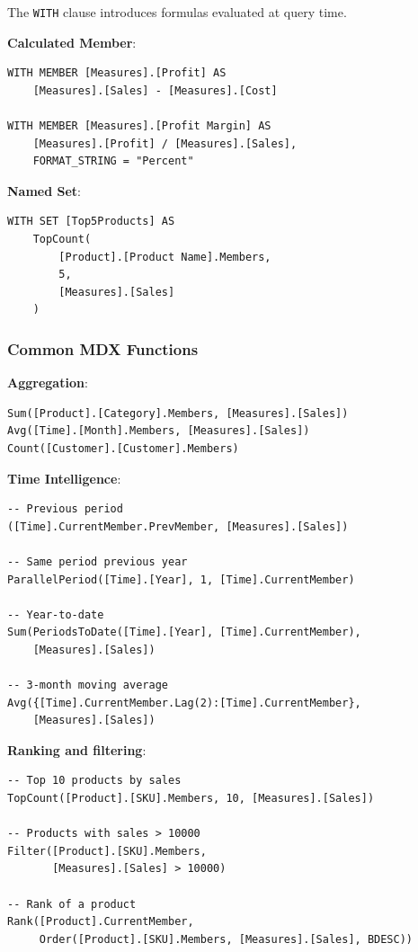 The \texttt{WITH} clause introduces formulas evaluated at query time.

\textbf{Calculated Member}:
\begin{lstlisting}
WITH MEMBER [Measures].[Profit] AS
    [Measures].[Sales] - [Measures].[Cost]

WITH MEMBER [Measures].[Profit Margin] AS
    [Measures].[Profit] / [Measures].[Sales],
    FORMAT_STRING = "Percent"
\end{lstlisting}

\textbf{Named Set}:
\begin{lstlisting}
WITH SET [Top5Products] AS
    TopCount(
        [Product].[Product Name].Members,
        5,
        [Measures].[Sales]
    )
\end{lstlisting}

\subsubsection{Common MDX Functions}
\label{subsec:mdx-common-functions}

\textbf{Aggregation}:
\begin{lstlisting}
Sum([Product].[Category].Members, [Measures].[Sales])
Avg([Time].[Month].Members, [Measures].[Sales])
Count([Customer].[Customer].Members)
\end{lstlisting}

\textbf{Time Intelligence}:
\begin{lstlisting}
-- Previous period
([Time].CurrentMember.PrevMember, [Measures].[Sales])

-- Same period previous year
ParallelPeriod([Time].[Year], 1, [Time].CurrentMember)

-- Year-to-date
Sum(PeriodsToDate([Time].[Year], [Time].CurrentMember),
    [Measures].[Sales])

-- 3-month moving average
Avg({[Time].CurrentMember.Lag(2):[Time].CurrentMember},
    [Measures].[Sales])
\end{lstlisting}

\textbf{Ranking and filtering}:
\begin{lstlisting}
-- Top 10 products by sales
TopCount([Product].[SKU].Members, 10, [Measures].[Sales])

-- Products with sales > 10000
Filter([Product].[SKU].Members,
       [Measures].[Sales] > 10000)

-- Rank of a product
Rank([Product].CurrentMember,
     Order([Product].[SKU].Members, [Measures].[Sales], BDESC))
\end{lstlisting}


